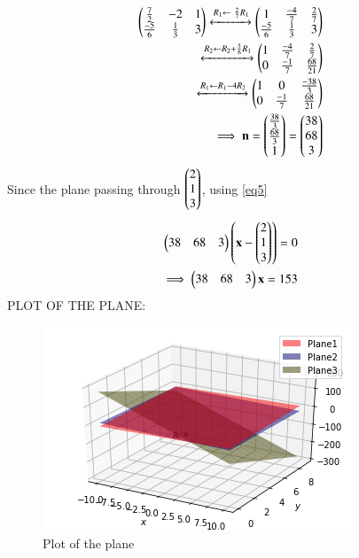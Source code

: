 \documentclass[journal,12pt,twocolumn]{IEEEtran}
\begin{document}
\begin{align}
\begin{pmatrix}\frac{7}{2} & -2 & 1\\\frac{-5}{6} & \frac{1}{3} & 3\end{pmatrix} 
\xleftrightarrow{R_1\leftarrow \ \frac{2}{7}R_1}\begin{pmatrix}1 & \frac{-4}{7} & \frac{2}{7}\\\frac{-5}{6} & \frac{1}{3} & 3\end{pmatrix} 
\\
\xleftrightarrow{R_2\leftarrow R_2 + \frac{5}{6}R_1}\begin{pmatrix}1 & \frac{-4}{7} & \frac{2}{7}\\0 & \frac{-1}{7} & \frac{68}{21}\end{pmatrix}
\\
\xleftrightarrow{R_1\leftarrow R_1 - 4R_2}\begin{pmatrix}1 & 0 & \frac{-38}{3} \\ 0 & \frac{-1}{7} & \frac{68}{21}\end{pmatrix}
\\
\implies\mathbf{n}=\begin{pmatrix}\frac{38}{3} \\ \frac{68}{3} \\ 1\end{pmatrix}=\begin{pmatrix}38\\68\\3\end{pmatrix}   \label{eq5}
\end{align}
Since the plane passing through $\begin{pmatrix}2\\1\\3\end{pmatrix}$, using \eqref{eq5}
\begin{align}
\begin{pmatrix}38 & 68 & 3\end{pmatrix}\begin{pmatrix}\mathbf{x}-\begin{pmatrix}2 \\ 1 \\ 3\end{pmatrix}\end{pmatrix}=0
\\
\implies\begin{pmatrix}38 & 68 & 3\end{pmatrix}\mathbf{x}=153
\end{align}
PLOT OF THE PLANE:
\begin{figure}[ht]
\centering
\includegraphics[width=\columnwidth]{Figure.png}
\caption{Plot of the plane}
\label{Plot of the plane}
\end{figure}
\end{document}
